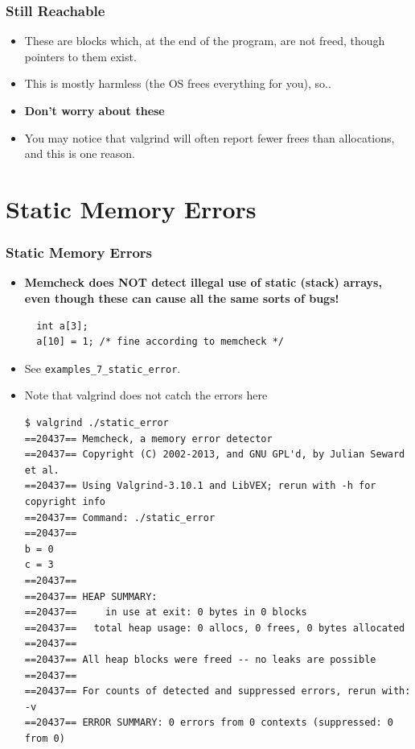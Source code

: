 \documentclass{beamer}
\begin{document}
\begin{frame}[fragile]
\frametitle{Still Reachable}
\begin{itemize}
\item These are blocks which, at the end of the program, are not freed, though pointers to them exist.
\item This is mostly harmless (the OS frees everything for you), so..
\item \textbf{Don't worry about these}
  \item You may notice that valgrind will often report fewer frees than allocations, and this is one reason. 
\end{itemize}
\end{frame}

\section{Static Memory Errors}

\begin{frame}[fragile]
\frametitle{Static Memory Errors}
\begin{itemize}
\item \textbf{Memcheck does NOT detect illegal use of static (stack) arrays, even though these can cause all the same sorts of bugs!}
  \begin{lstlisting}
  int a[3];
  a[10] = 1; /* fine according to memcheck */
  \end{lstlisting}
\item See \texttt{examples\_7\_static\_error}. 
\item Note that valgrind does not catch the errors here
\begin{lstlisting}
$ valgrind ./static_error
==20437== Memcheck, a memory error detector
==20437== Copyright (C) 2002-2013, and GNU GPL'd, by Julian Seward et al.
==20437== Using Valgrind-3.10.1 and LibVEX; rerun with -h for copyright info
==20437== Command: ./static_error
==20437==
b = 0
c = 3
==20437==
==20437== HEAP SUMMARY:
==20437==     in use at exit: 0 bytes in 0 blocks
==20437==   total heap usage: 0 allocs, 0 frees, 0 bytes allocated
==20437==
==20437== All heap blocks were freed -- no leaks are possible
==20437==
==20437== For counts of detected and suppressed errors, rerun with: -v
==20437== ERROR SUMMARY: 0 errors from 0 contexts (suppressed: 0 from 0)
\end{lstlisting}
\end{itemize}
\end{frame}
\end{document}
